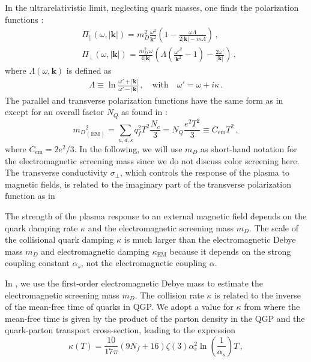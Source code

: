 In the ultrarelativistic limit, neglecting quark masses, one finds the polarization functions \cite{Formanek:2021blc}:
\begin{align}\label{eq:polfuncsUltra}
&\Pi_{\parallel}(\omega,|\boldsymbol{k}|) = m_D^2\frac{\omega^2}{\boldsymbol{k}^2}\left(1 - \frac{\omega \Lambda}{2|\boldsymbol{k}|-i\kappa \Lambda}\right)\,,\\
&\Pi_{\perp}(\omega,|\boldsymbol{k}|) = \frac{m_D^2\,\omega}{4 |\boldsymbol{k}|}\left( \Lambda \left(\frac{\omega'^2}{\boldsymbol{k}^2} - 1\right) - \frac{2\omega'}{ |\boldsymbol{k}|}\right)\,,
\end{align}
where $\Lambda(\omega,\boldsymbol{k})$ is defined as
\begin{align}\label{eq:definitions}
 \Lambda \equiv \ln \frac{\omega'+  |\boldsymbol{k}|}{\omega'- |\boldsymbol{k}|}\,, \quad \text{with} \quad \omega' = \omega+i\kappa\,.
\end{align}
The parallel and transverse polarization functions have the same form as in \cite{Formanek:2021blc} except for an overall factor $N_Q$  as found in \cite{Kapusta:1992fm,Grayson:2022asf}:
\begin{equation}\label{eq:DebyemQCD}
    {m_D}^2_{(\text{EM})} = \sum_{u,d,s} q^2_f T^2 \frac{N_c}{3} = N_Q\frac{e^2T^2}{3} \equiv C_{\text{em}}T^2\,,
\end{equation}
where $C_{\text{em}} =  2e^2/3$. In the following, we will use $m_D$ as short-hand notation for the electromagnetic screening mass since we do not discuss color screening here.
The transverse conductivity $\sigma_{\perp}$, which controls the response of the plasma to magnetic fields, is related to the imaginary part of the transverse polarization function as in 

The strength of the plasma response to an external magnetic field depends on the quark damping rate $\kappa$ and the electromagnetic screening mass $m_D$. The scale of the collisional quark damping $\kappa$ is much larger than the electromagnetic Debye mass $m_D$ and electromagnetic damping $\kappa_{\text{EM}}$ because it depends on the strong coupling constant $\alpha_s$, not the electromagnetic coupling $\alpha$.

In \cite{Grayson:2022asf}, we use the first-order electromagnetic Debye mass  to estimate the electromagnetic screening mass $m_D$. The collision rate $\kappa$ is related to the inverse of the mean-free time of quarks in QGP. We adopt a value for $\kappa$ from \cite{Mrowczynski:1988xu} where the mean-free time is given by the product of the parton density in the QGP and the quark-parton transport cross-section, leading to the expression 
\begin{equation}\label{eq:kappadef}
    \kappa(T) = \frac{10}{17\pi} (9 N_f +16) \zeta(3) \alpha_s^2 \ln\left(\frac{1}{\alpha_s}\right) T\,,
\end{equation}


